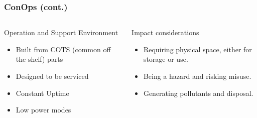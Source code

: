 \documentclass[aspectratio=169]{beamer}
\begin{document}
\begin{frame}
    \frametitle{ConOps (cont.)}

    \begin{columns}
        \begin{column}{0.48\textwidth}
            \begin{block}{Operation and Support Environment}
                \begin{itemize}
                 \item Built from COTS (common off the shelf) parts
                 \item Designed to be serviced
                 \item Constant Uptime
                 \item Low power modes
                \end{itemize}
            \end{block}
        \end{column}

        \begin{column}{0.48\textwidth}
            \begin{block}{Impact considerations}
                \begin{itemize}
                 \item Requiring physical space, either for storage or use.
                 \item Being a hazard and risking misuse.
                 \item Generating pollutants and disposal.
                \end{itemize}
            \end{block}
        \end{column}
    \end{columns}


\end{frame}
\end{document}
